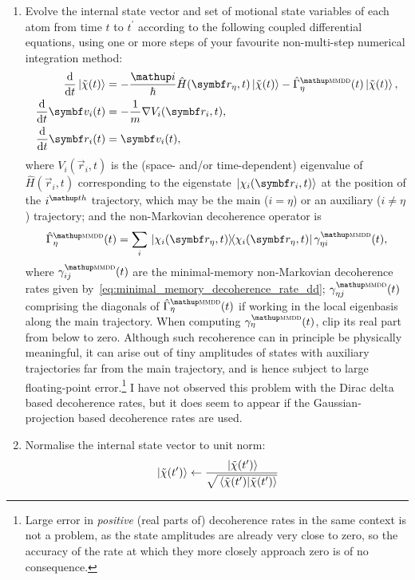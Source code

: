 \begin{enumerate}
    \item Evolve the internal state vector and set of motional state variables of each atom from time $t$ to $t^\prime$ according to the following coupled differential equations, using one or more steps of your favourite non-multi-step numerical integration method:
    \begin{align}
    \dv{t}\ket{\tilde\chi(t)} &= -\frac\ii\hbar \hat H(\vec r_\eta, t)\ket{\tilde\chi(t)} - \hat\Gamma^\up{\textsc{mmdd}}_\eta(t)\ket{\tilde\chi(t)},\\
    \dv{t}\vec v_i(t) &= -\frac1m\nabla V_i(\vec r_i, t),\\
    \dv{t}\vec r_i(t) &= \vec v_i(t),
    \end{align}
    where $V_i(\vec r_i, t)$ is the (space- and/or time-dependent) eigenvalue of $\hat H(\vec r_i, t)$ corresponding to the eigenstate $\ket{\chi_i(\vec r_i, t)}$ at the position of the $i^\up{th}$ trajectory, which may be the main ($i=\eta$) or an auxiliary ($i\neq\eta$) trajectory; and the non-Markovian decoherence operator is
    \begin{align}
    \hat\Gamma^\up{\textsc{mmdd}}_\eta(t) = \sum_i\ketbra{\chi_i(\vec r_\eta, t)}{\chi_i(\vec r_\eta, t)}\gamma^\up{\textsc{mmdd}}_{\eta i}(t),
    \end{align}
    where $\gamma^\up{\textsc{mmdd}}_{ij}(t)$ are the minimal-memory non-Markovian decoherence rates given by~\eqref{eq:minimal_memory_decoherence_rate_dd}; $\gamma^\up{\textsc{mmdd}}_{\eta j}(t)$ comprising the diagonals of $\hat\Gamma^\up{\textsc{mmdd}}_\eta(t)$ if working in the local eigenbasis along the main trajectory. When computing $\gamma^\up{\textsc{mmdd}}_\eta(t)$, clip its real part from below to zero. Although such recoherence can in principle be physically meaningful, it can arise out of tiny amplitudes of states with auxiliary trajectories far from the main trajectory, and is hence subject to large floating-point error.\footnote{Large error in \emph{positive} (real parts of) decoherence rates in the same context is not a problem, as the state amplitudes are already very close to zero, so the accuracy of the rate at which they more closely approach zero is of no consequence.} I have not observed this problem with the Dirac delta based decoherence rates, but it does seem to appear if the Gaussian-projection based decoherence rates are used.

    \item Normalise the internal state vector to unit norm:
    \begin{align}
    \ket{\tilde\chi(t^\prime)} \leftarrow \frac{\ket{\tilde\chi(t^\prime)}}
                               {\sqrt{\braket{\tilde\chi(t^\prime)}{\tilde\chi(t^\prime)}}}
    \end{align}


\end{enumerate}
